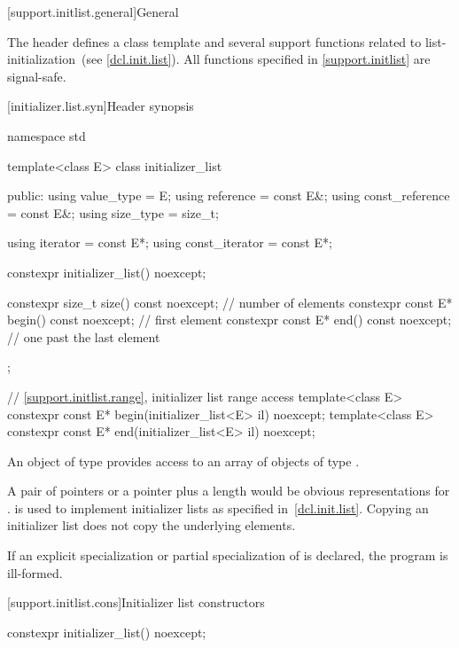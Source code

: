 [support.initlist.general]{General}

\pnum
The header  defines a class template and several
support functions related to list-initialization~(see \ref{dcl.init.list}).
%
All functions specified in \ref{support.initlist} are signal-safe.

[initializer.list.syn]{Header  synopsis}
%
%
%

\begin{codeblock}
namespace std {
  template<class E> class initializer_list {
  public:
    using value_type      = E;
    using reference       = const E&;
    using const_reference = const E&;
    using size_type       = size_t;

    using iterator        = const E*;
    using const_iterator  = const E*;

    constexpr initializer_list() noexcept;

    constexpr size_t size() const noexcept;     // number of elements
    constexpr const E* begin() const noexcept;  // first element
    constexpr const E* end() const noexcept;    // one past the last element
  };

  // \ref{support.initlist.range}, initializer list range access
  template<class E> constexpr const E* begin(initializer_list<E> il) noexcept;
  template<class E> constexpr const E* end(initializer_list<E> il) noexcept;
}
\end{codeblock}

\pnum
An object of type  provides access to an array of
objects of type .
\begin{note}
A pair of pointers or a pointer plus
a length would be obvious representations for .
 is used to implement initializer lists as specified
in~\ref{dcl.init.list}. Copying an initializer list does not copy the underlying
elements.
\end{note}

\pnum
If an explicit specialization or partial specialization of
 is declared, the program is ill-formed.

[support.initlist.cons]{Initializer list constructors}

%
\begin{itemdecl}
constexpr initializer_list() noexcept;
\end{itemdecl}

